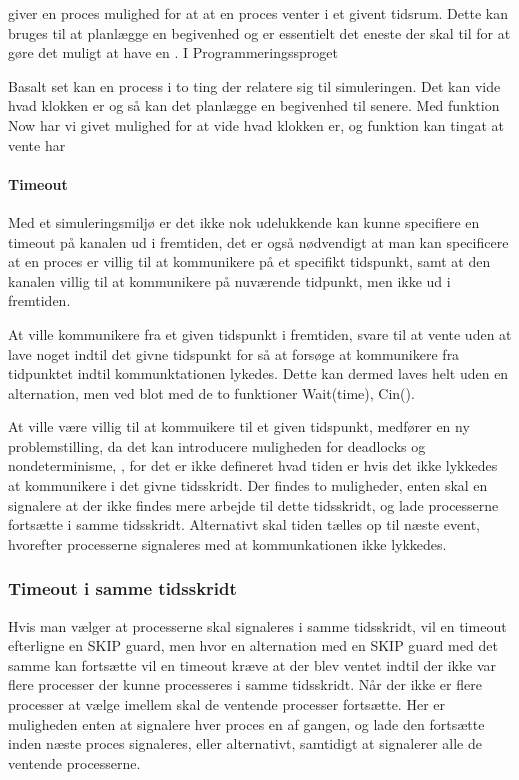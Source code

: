  giver en proces mulighed for at at en proces venter i et givent tidsrum. Dette kan bruges til at planlægge en begivenhed og er essentielt det eneste der skal til for at gøre det muligt at have en \des. I Programmeringssproget \simpy  


Basalt set kan en process i \des to ting der relatere sig til simuleringen. Det kan vide hvad klokken er og så kan det planlægge en begivenhed til senere. Med funktion Now har vi givet mulighed for at vide hvad klokken er, og funktion kan  tingat at vente har 



\paragraph*{Timeout}
Med et simuleringsmiljø er det ikke nok udelukkende kan kunne specifiere en 
timeout på kanalen ud i fremtiden, det er også nødvendigt at man kan specificere at en proces 
er villig til at kommunikere på et specifikt tidspunkt, samt at den kanalen 
villig til at kommunikere på nuværende tidpunkt, men ikke ud 
i fremtiden.  

At ville kommunikere fra et given tidspunkt i fremtiden,  svare til at vente 
uden at lave noget indtil det givne tidspunkt for så at forsøge at kommunikere 
fra tidpunktet indtil kommunktationen lykedes. Dette kan dermed laves helt 
uden en alternation, men ved blot med de to funktioner Wait(time), Cin(). 

At ville være villig til at kommuikere til et given tidspunkt, medfører en ny 
problemstilling, da det kan introducere muligheden for deadlocks og 
nondeterminisme, , for det er ikke defineret hvad 
tiden er hvis det ikke lykkedes at kommunikere i det givne tidsskridt. Der 
findes to muligheder, enten skal \sched en signalere at der ikke findes mere 
arbejde til dette tidsskridt, og lade processerne fortsætte i samme 
tidsskridt. Alternativt skal tiden tælles op til næste event, hvorefter 
processerne signaleres med at kommunkationen ikke lykkedes. 

\subsubsection{Timeout i samme tidsskridt}
Hvis man vælger at processerne skal signaleres i samme tidsskridt, vil en 
timeout efterligne en SKIP guard, men hvor en alternation med en SKIP guard 
med det samme kan fortsætte vil en timeout kræve at der blev ventet indtil der 
ikke var flere processer der kunne processeres i samme tidsskridt. Når der 
ikke er flere processer at vælge imellem skal de ventende processer fortsætte. 
Her er muligheden enten at signalere hver proces en af gangen, og lade den 
fortsætte inden næste proces signaleres, eller alternativt, samtidigt at 
signalerer alle de ventende processerne.

